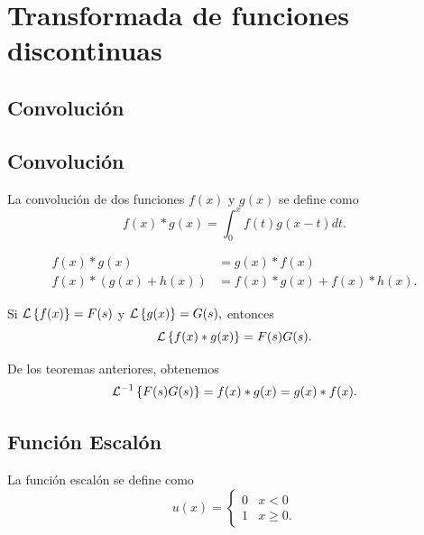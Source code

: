 \section{Transformada de funciones discontinuas}

\subsection{Convoluci\'on}


	\subsection{Convoluci\'on}
	La convoluci\'on de dos funciones $f(x)$ y $g(x)$ se define como
	\begin{equation}
	\label{bron:23.1}
	f(x)\ast g(x)=\int_{0}^{x}f(t)g(x-t)dt.
	\end{equation}
	



	\begin{thm}
		\label{bron:thm:23.1}
		\begin{align}
		f(x) \ast g(x)&=g(x) \ast f(x)\\
		f(x) \ast \left( g(x)+h(x) \right)
		&= f(x)\ast g(x)+ f(x)\ast h(x).
		\end{align}
		
	\end{thm}
	



	\begin{thm}
		Si $\mathcal{L}\left\{ f(x) \right\}=F(s)$ y $\mathcal{L}\left\{ g(x) \right\}=G(s),$ entonces
		$$
		\mathcal{L}\left\{ f(x) \ast g(x) \right\}=F(s)G(s).
		$$
	\end{thm}
	




	De los teoremas anteriores, obtenemos
	\begin{equation}
	\label{bron:23.2}
	\mathcal{L}^{-1}\left\{ F(s)G(s) \right\}=f(x) \ast g(x)= g(x) \ast f(x).
	\end{equation}
	


\subsection{Funci\'on Escal\'on}


	La funci\'on escal\'on se define como
	$$
	u(x)=\begin{cases}
	0 & x<0\\
	1 & x\geq 0.
	\end{cases}
	$$



